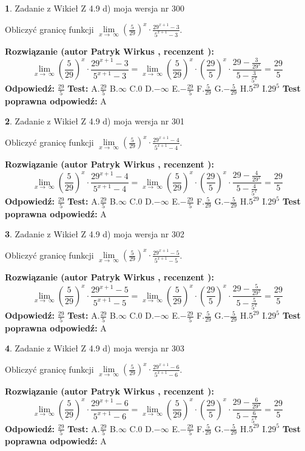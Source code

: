 \documentclass[12pt, a4paper]{article}
\theoremstyle{definition} %
\newtheorem{zad}{}
\newcommand{\zadStart}[1]{\begin{zad}#1\newline}
\newcommand{\zadStop}{\end{zad}}
\newcommand{\rozwStart}[2]{\noindent \textbf{Rozwiązanie (autor #1 , recenzent #2): }\newline}
\newcommand{\rozwStop}{\newline}
\newcommand{\odpStart}{\noindent \textbf{Odpowiedź:}\newline}
\newcommand{\odpStop}{\newline}
\newcommand{\testStart}{\noindent \textbf{Test:}\newline}
\newcommand{\testStop}{\newline}
\newcommand{\kluczStart}{\noindent \textbf{Test poprawna odpowiedź:}\newline}
\newcommand{\kluczStop}{\newline}
\begin{document}
\zadStart{Zadanie z Wikieł Z 4.9 d) moja wersja nr 300}


Obliczyć granicę funkcji  $\lim\limits_{x\to\ \infty}(\frac{5}{29})^{x}\cdot\frac{29^{x+1}-3}{5^{x+1}-3}$.
\zadStop
\rozwStart{Patryk Wirkus}{}
$$\lim\limits_{x\to\ \infty}(\frac{5}{29})^{x}\cdot\frac{29^{x+1}-3}{5^{x+1}-3}=\lim\limits_{x\to\ \infty}(\frac{5}{29})^{x}\cdot(\frac{29}{5})^{x} \cdot \frac{29-\frac{3}{29^{x}}}{5-\frac{3}{5^{x}}} = \frac{29}{5}$$
\rozwStop
\odpStart
$\frac{29}{5}$
\odpStop
\testStart
A.$\frac{29}{5}$ B.$\infty$ C.$0$ D.$-\infty$ E.$-\frac{29}{5}$
F.$\frac{5}{29}$ G.$-\frac{5}{29}$
H.$5^{29}$
I.$29^{5}$
\testStop
\kluczStart
A
\kluczStop



\zadStart{Zadanie z Wikieł Z 4.9 d) moja wersja nr 301}


Obliczyć granicę funkcji  $\lim\limits_{x\to\ \infty}(\frac{5}{29})^{x}\cdot\frac{29^{x+1}-4}{5^{x+1}-4}$.
\zadStop
\rozwStart{Patryk Wirkus}{}
$$\lim\limits_{x\to\ \infty}(\frac{5}{29})^{x}\cdot\frac{29^{x+1}-4}{5^{x+1}-4}=\lim\limits_{x\to\ \infty}(\frac{5}{29})^{x}\cdot(\frac{29}{5})^{x} \cdot \frac{29-\frac{4}{29^{x}}}{5-\frac{4}{5^{x}}} = \frac{29}{5}$$
\rozwStop
\odpStart
$\frac{29}{5}$
\odpStop
\testStart
A.$\frac{29}{5}$ B.$\infty$ C.$0$ D.$-\infty$ E.$-\frac{29}{5}$
F.$\frac{5}{29}$ G.$-\frac{5}{29}$
H.$5^{29}$
I.$29^{5}$
\testStop
\kluczStart
A
\kluczStop



\zadStart{Zadanie z Wikieł Z 4.9 d) moja wersja nr 302}


Obliczyć granicę funkcji  $\lim\limits_{x\to\ \infty}(\frac{5}{29})^{x}\cdot\frac{29^{x+1}-5}{5^{x+1}-5}$.
\zadStop
\rozwStart{Patryk Wirkus}{}
$$\lim\limits_{x\to\ \infty}(\frac{5}{29})^{x}\cdot\frac{29^{x+1}-5}{5^{x+1}-5}=\lim\limits_{x\to\ \infty}(\frac{5}{29})^{x}\cdot(\frac{29}{5})^{x} \cdot \frac{29-\frac{5}{29^{x}}}{5-\frac{5}{5^{x}}} = \frac{29}{5}$$
\rozwStop
\odpStart
$\frac{29}{5}$
\odpStop
\testStart
A.$\frac{29}{5}$ B.$\infty$ C.$0$ D.$-\infty$ E.$-\frac{29}{5}$
F.$\frac{5}{29}$ G.$-\frac{5}{29}$
H.$5^{29}$
I.$29^{5}$
\testStop
\kluczStart
A
\kluczStop



\zadStart{Zadanie z Wikieł Z 4.9 d) moja wersja nr 303}


Obliczyć granicę funkcji  $\lim\limits_{x\to\ \infty}(\frac{5}{29})^{x}\cdot\frac{29^{x+1}-6}{5^{x+1}-6}$.
\zadStop
\rozwStart{Patryk Wirkus}{}
$$\lim\limits_{x\to\ \infty}(\frac{5}{29})^{x}\cdot\frac{29^{x+1}-6}{5^{x+1}-6}=\lim\limits_{x\to\ \infty}(\frac{5}{29})^{x}\cdot(\frac{29}{5})^{x} \cdot \frac{29-\frac{6}{29^{x}}}{5-\frac{6}{5^{x}}} = \frac{29}{5}$$
\rozwStop
\odpStart
$\frac{29}{5}$
\odpStop
\testStart
A.$\frac{29}{5}$ B.$\infty$ C.$0$ D.$-\infty$ E.$-\frac{29}{5}$
F.$\frac{5}{29}$ G.$-\frac{5}{29}$
H.$5^{29}$
I.$29^{5}$
\testStop
\kluczStart
A
\kluczStop
\end{document}
